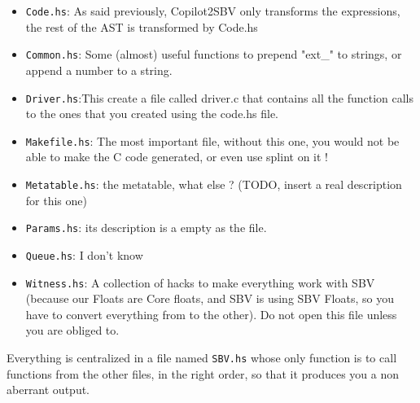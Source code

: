 \begin{itemize}
	\item \texttt{Code.hs}: As said previously, Copilot2SBV only transforms the expressions, the rest of the AST is transformed by Code.hs
	\item \texttt{Common.hs}: Some (almost) useful functions to prepend "ext\_" to strings, or append a number to a string.
	\item \texttt{Driver.hs}:This create a file called driver.c that contains all the function calls to the ones that you created using the code.hs file.
	\item \texttt{Makefile.hs}: The most important file, without this one, you would not be able to make the C code generated, or even use splint on it !
	\item \texttt{Metatable.hs}: the metatable, what else ? (TODO, insert a real description for this one)
	\item \texttt{Params.hs}: its description is a empty as the file.
	\item \texttt{Queue.hs}: I don't know
	\item \texttt{Witness.hs}: A collection of hacks to make everything work with SBV (because our Floats are Core floats, and SBV is using SBV Floats, so you have to convert everything from to the other). Do not open this file unless you are obliged to.
\end{itemize}

Everything is centralized in a file named \texttt{SBV.hs} whose only function is to call functions from the other files, in the right order, so that it produces you a non aberrant output.